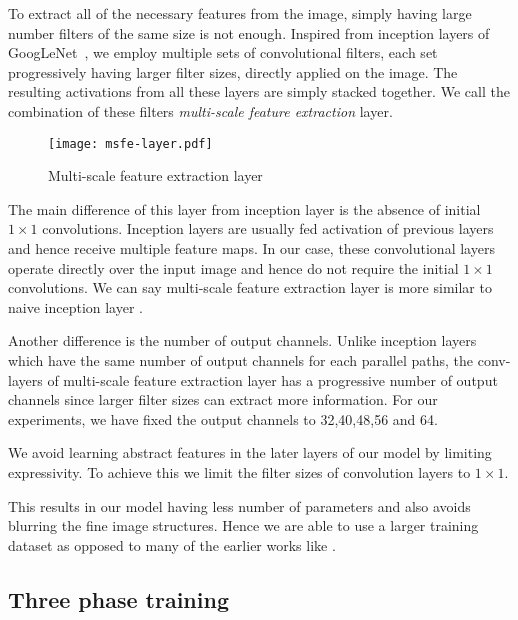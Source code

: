 \documentclass[10pt,twocolumn,letterpaper]{proc}
\begin{document}
To extract all of the necessary features from the image, simply having large number filters of the same size is not enough. Inspired from inception layers of GoogLeNet~\cite{Szegedy_2015_CVPR}, we employ multiple sets of convolutional filters, each set progressively having larger filter sizes, directly applied on the image. The resulting activations from all these layers are simply stacked together. We call the combination of these filters \textit{multi-scale feature extraction} layer.
\begin{figure}[ht]
    \centering
    \texttt{[image: msfe-layer.pdf]}
    \caption{Multi-scale feature extraction layer}
    \label{fig:multifeat}
\end{figure}

The main difference of this layer from inception layer is the absence of initial $1 \times 1$ convolutions. Inception layers are usually fed activation of previous layers and hence receive multiple feature maps. In our case, these convolutional layers operate directly over the input image and hence do not require the initial $1 \times 1$ convolutions. We can say multi-scale feature extraction layer is more similar to naive inception layer \cite{Szegedy_2015_CVPR}.

Another difference is the number of output channels. Unlike inception layers which have the same number of output channels for each parallel paths, the conv-layers of multi-scale feature extraction layer has a progressive number of output channels since larger filter sizes can extract more information.
For our experiments, we have fixed the output channels to 32,40,48,56  and  64.

We avoid learning abstract features in the later layers of our model by limiting expressivity. To achieve this we limit the filter sizes of convolution layers to $1\times1$.

This results in our model having less number of parameters and also avoids blurring the fine image structures. Hence we are able to use a larger training dataset as opposed to many of the earlier works like \cite{Vemulapalli_2016_CVPR,roth2005fields}.
    
\subsection{Three phase training}\label{sec:training}
%    
\end{document}
